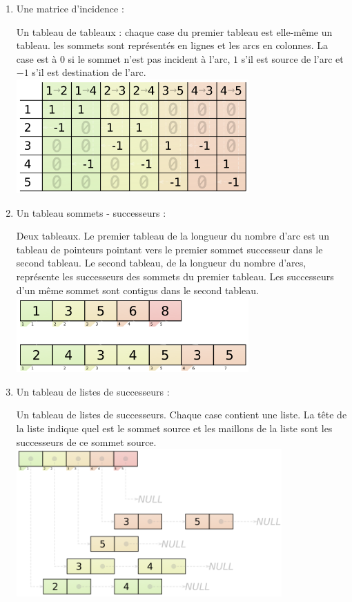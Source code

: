 \documentclass[11pt, a4paper]{report}
\begin{document}
	\pagebreak
	\begin{enumerate}
		\item Une matrice d'incidence :
		
		Un tableau de tableaux : chaque case du premier tableau est elle-même un tableau. les sommets sont représentés en lignes et les arcs en colonnes. La case est à $0$ si le sommet n'est pas incident à l'arc, $1$ s'il est source de l'arc et $-1$ s'il est destination de l'arc.\\
		\includegraphics[width=0.7\textwidth]{images/Matrice_incidence.png}\\
		
		\item Un tableau sommets - successeurs :
		
		Deux tableaux. Le premier tableau de la longueur du nombre d'arc est un tableau de pointeurs pointant vers le premier sommet successeur dans le second tableau. Le second tableau, de la longueur du nombre d'arcs, représente les successeurs des sommets du premier tableau. Les successeurs d'un même sommet sont contigus dans le second tableau.\\
		\includegraphics[width=0.7\textwidth]{images/tableau_pointeur_succ.png}\\

		\pagebreak
		\item Un tableau de listes de successeurs :
		
		Un tableau de listes de successeurs. Chaque case contient une liste. La tête de la liste indique quel est le sommet source et les maillons de la liste sont les successeurs de ce sommet source.\\
		\includegraphics[width=0.8\textwidth]{images/tableau_liste_succ.png}\\
		
	\end{enumerate}
	
\end{document}
